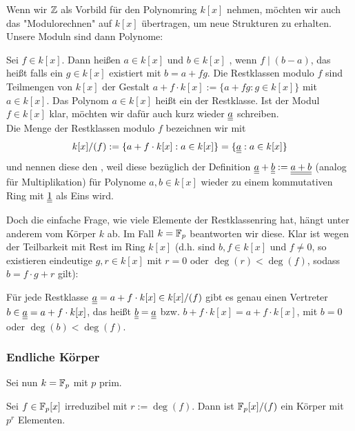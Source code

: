 Wenn wir $\mathbb{Z}$ als Vorbild für den Polynomring $k[x]$ nehmen, möchten wir auch das "Modulorechnen" auf $k[x]$ übertragen, um neue Strukturen zu erhalten. 
Unsere Moduln sind dann Polynome:
\begin{defn}
	Sei $f \in k[x]$. 
	Dann heißen $a \in k[x]$ und $b \in k[x]$ , wenn $f \mid (b-a)$, das heißt falls ein $g \in k[x]$ existiert mit $b = a + fg$. Die Restklassen modulo $f$ sind Teilmengen von $k[x]$ der Gestalt $a + f \cdot k[x] := \{a + fg : g \in k[x]\}$ mit $a \in k[x]$. 
	Das Polynom $a \in k[x]$ heißt ein  der Restklasse. 
	Ist der Modul $f \in k[x]$ klar, möchten wir dafür auch kurz wieder $\uline{\uline{a}}$ schreiben. \\
	Die Menge der Restklassen modulo $f$ bezeichnen wir mit
	\[ k[x] / (f) := \{a + f\cdot k[x] : a \in k[x]\} = \{\uline{\uline{a}} : a \in k[x]\} \]
	und nennen diese den , weil diese bezüglich der Definition $\uline{\uline{a}} + \uline{\uline{b}} := \uline{\uline{a+b}}$ (analog für Multiplikation) für Polynome $a,b \in k[x]$ wieder zu einem kommutativen Ring mit $\uline{\uline{1}}$ als Eins wird. 
\end{defn}

Doch die einfache Frage, wie viele Elemente der Restklassenring hat, hängt unter anderem vom Körper $k$ ab. 
Im Fall $k = \mathbb{F}_p$ beantworten wir diese. 
Klar ist wegen der Teilbarkeit mit Rest im Ring $k[x]$ (d.h. sind $b,f \in k[x]$ und $f \neq 0$, so existieren eindeutige $g,r \in k[x]$ mit $r = 0$ oder $\deg(r) < \deg(f)$, sodass $b = f\cdot g + r$ gilt):
\begin{bem}
\label{bem_7.12}
	Für jede Restklasse $\uline{\uline{a}} = a + f \cdot k[x] \in k[x]/(f)$ gibt es genau einen Vertreter $b \in \uline{\uline{a}} = a + f\cdot k[x]$, das heißt $\uline{\uline{b}} = \uline{\uline{a}}$ bzw. $b + f \cdot k[x] = a + f \cdot k[x]$, mit $b = 0$ oder $\deg(b) < \deg(f)$.
\end{bem}

\subsubsection{Endliche Körper}
\label{subsub:2.1.2}
	Sei nun $k = \mathbb{F}_p$ mit $p$ prim.

\begin{satz}
	Sei $f \in \mathbb{F}_p[x]$ irreduzibel mit $r := \deg(f)$. 
	Dann ist $\mathbb{F}_p[x]/(f)$ ein Körper mit $p^r$ Elementen.
\end{satz}

